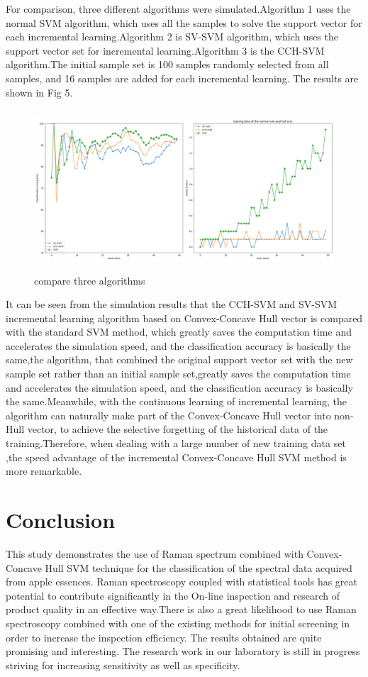 \documentclass[a4paper]{article}
\begin{document}
For comparison, three different algorithms were simulated.Algorithm 1 uses the normal SVM algorithm, which uses all the samples to solve the support vector for each incremental learning.Algorithm 2 is SV-SVM algorithm, which uses the support vector set for incremental learning.Algorithm 3 is the CCH-SVM algorithm.The initial sample set is 100 samples randomly selected from all samples, and 16 samples are added for each incremental learning. The results are shown in Fig 5.

\begin{figure}[h]
  \centering
  \includegraphics[width=15cm,height=6cm]{Figure_2}
  \caption{compare three algorithms}
\end{figure}

It can be seen from the simulation results that the CCH-SVM and SV-SVM incremental learning algorithm based on Convex-Concave Hull vector is compared with the standard SVM method, which greatly saves the computation time and accelerates the simulation speed, and the classification accuracy is basically the same,the algorithm, that combined the original support vector set with the new sample set rather than an initial sample set,greatly saves the computation time and accelerates the simulation speed, and the classification accuracy is basically the same.Meanwhile, with the continuous learning of incremental learning, the algorithm can naturally make part of the Convex-Concave Hull vector into non-Hull vector, to achieve the selective forgetting of the historical data of the training.Therefore, when dealing with a large number of new training data set ,the speed advantage of the incremental Convex-Concave Hull SVM method is more remarkable.

\section{Conclusion}
This  study  demonstrates  the  use  of  Raman  spectrum  combined  with Convex-Concave Hull SVM  technique  for the  classification  of  the  spectral  data  acquired  from  apple essences. Raman  spectroscopy  coupled  with  statistical  tools  has  great  potential  to  contribute significantly in the On-line inspection and research of product quality in an effective way.There is also a great  likelihood  to  use  Raman  spectroscopy  combined  with  one  of  the  existing  methods  for initial screening in order to increase the inspection efficiency. The results obtained are quite promising and interesting. The research work in our laboratory is still in progress striving for increasing sensitivity as well as specificity.
\end{document}
